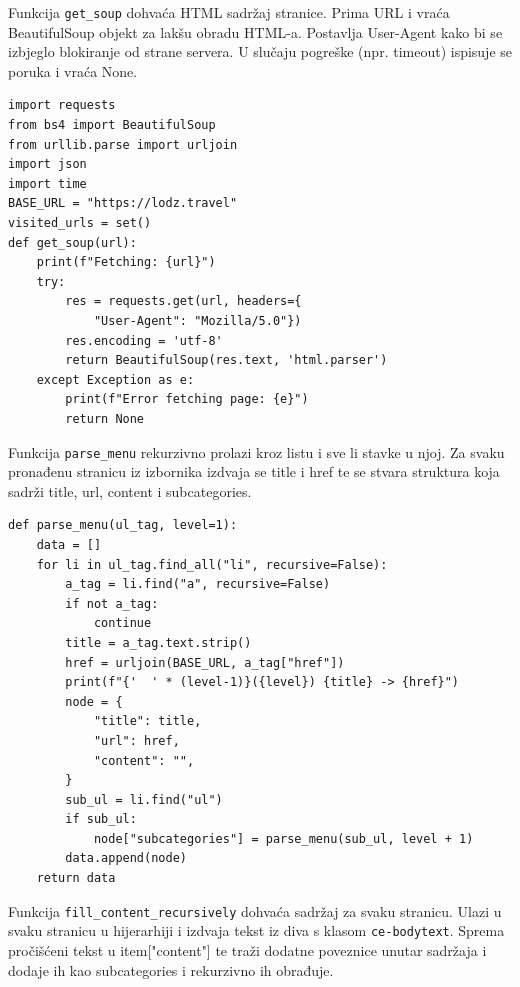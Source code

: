 \documentclass[]{foi}
\begin{document}
Funkcija \verb|get_soup| dohvaća HTML sadržaj stranice. Prima URL i vraća BeautifulSoup objekt za lakšu obradu HTML-a. Postavlja User-Agent 
kako bi se izbjeglo blokiranje od strane servera. U slučaju pogreške (npr. timeout) ispisuje se poruka i vraća None. 

\begin{longlisting}
\begin{verbatim}
import requests
from bs4 import BeautifulSoup
from urllib.parse import urljoin
import json
import time
BASE_URL = "https://lodz.travel"
visited_urls = set()
def get_soup(url):
    print(f"Fetching: {url}")
    try:
        res = requests.get(url, headers={
            "User-Agent": "Mozilla/5.0"})
        res.encoding = 'utf-8'
        return BeautifulSoup(res.text, 'html.parser')
    except Exception as e:
        print(f"Error fetching page: {e}")
        return None
\end{verbatim}
\caption{Scraper 1/6}
\label{lst:scraper1}
\end{longlisting}

Funkcija \verb|parse_menu| rekurzivno prolazi kroz listu i sve li stavke u njoj. Za svaku pronađenu stranicu iz izbornika izdvaja se title i href te se stvara
struktura koja sadrži title, url, content i subcategories.

\begin{longlisting}
\begin{verbatim}
def parse_menu(ul_tag, level=1):
    data = []
    for li in ul_tag.find_all("li", recursive=False):
        a_tag = li.find("a", recursive=False)
        if not a_tag:
            continue
        title = a_tag.text.strip()
        href = urljoin(BASE_URL, a_tag["href"])
        print(f"{'  ' * (level-1)}({level}) {title} -> {href}")
        node = {
            "title": title,
            "url": href,
            "content": "",
        }
        sub_ul = li.find("ul")
        if sub_ul:
            node["subcategories"] = parse_menu(sub_ul, level + 1)
        data.append(node)
    return data
\end{verbatim}
\caption{Scraper 2/6}
\label{lst:scraper2}
\end{longlisting}

Funkcija \verb|fill_content_recursively| dohvaća sadržaj za svaku stranicu. Ulazi u svaku stranicu u hijerarhiji i izdvaja tekst iz diva s klasom \verb|ce-bodytext|.
Sprema pročišćeni tekst u item["content"] te traži dodatne poveznice unutar sadržaja i dodaje ih kao subcategories i rekurzivno ih obrađuje.
\end{document}

